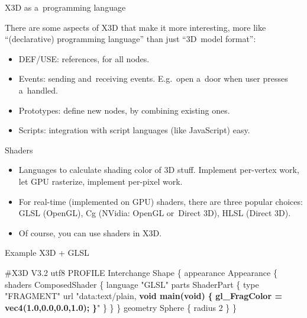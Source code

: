 \documentclass{beamer}
\begin{document}
\begin{frame}{X3D as a~programming language}

There are some aspects of X3D that make it more interesting,
more like ``(declarative) programming language'' than just ``3D~model format'':

\begin{itemize}
  \item DEF/USE: references, for all nodes.
  \item Events: sending and~receiving events.
    E.g.~open a~door when user presses a~handled.
  \item Prototypes: define new nodes,
    by combining existing ones.
  \item Scripts: integration with script languages (like JavaScript) easy.
\end{itemize}
\end{frame}

\begin{frame}{Shaders}

\begin{itemize}
  \item Languages to calculate shading color of 3D stuff.
    Implement per-vertex work,
    let GPU rasterize, implement per-pixel work.
  \item For real-time (implemented on GPU) shaders, there are three
    popular choices: GLSL (OpenGL), Cg (NVidia: OpenGL or~Direct 3D),
    HLSL (Direct 3D).
  \item Of course, you can use shaders in X3D.
\end{itemize}
\end{frame}

\begin{frame}[fragile]
\begin{exampleblock}{Example X3D + GLSL}
\begin{semiverbatim}
\#X3D V3.2 utf8
PROFILE Interchange
Shape \{
  appearance Appearance \{
    shaders ComposedShader \{
      language "GLSL"
      parts ShaderPart \{
        type "FRAGMENT"
        url "data:text/plain,
        \textbf{void main(void)}
        \textbf{\{}
          \textbf{gl\_FragColor = vec4(1.0,0.0,0.0,1.0);}
        \textbf{\}}" \} \} \}
  geometry Sphere \{ radius 2 \}
\}
\end{semiverbatim}
\end{exampleblock}
\end{frame}
\end{document}
